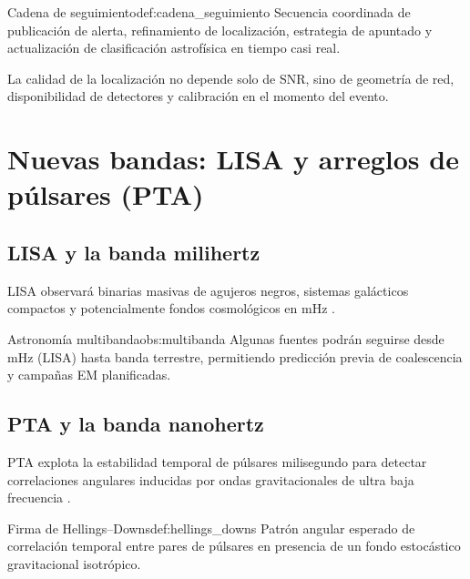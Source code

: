 \begin{definicion}{Cadena de seguimiento}{def:cadena_seguimiento}
Secuencia coordinada de publicación de alerta, refinamiento de localización, estrategia de apuntado y actualización de clasificación astrofísica en tiempo casi real.
\end{definicion}

\begin{importante}
La calidad de la localización no depende solo de SNR, sino de geometría de red, disponibilidad de detectores y calibración en el momento del evento.
\end{importante}

\section{Nuevas bandas: LISA y arreglos de púlsares (PTA)}
\label{sec:lisa_pta}

\subsection{LISA y la banda milihertz}

LISA observará binarias masivas de agujeros negros, sistemas galácticos compactos y potencialmente fondos cosmológicos en mHz \cite{LISA2017}.

\begin{observacion}{Astronomía multibanda}{obs:multibanda}
Algunas fuentes podrán seguirse desde mHz (LISA) hasta banda terrestre, permitiendo predicción previa de coalescencia y campañas EM planificadas.
\end{observacion}

\subsection{PTA y la banda nanohertz}

PTA explota la estabilidad temporal de púlsares milisegundo para detectar correlaciones angulares inducidas por ondas gravitacionales de ultra baja frecuencia \cite{NANOGrav2023}.

\begin{definicion}{Firma de Hellings--Downs}{def:hellings_downs}
Patrón angular esperado de correlación temporal entre pares de púlsares en presencia de un fondo estocástico gravitacional isotrópico.
\end{definicion}

